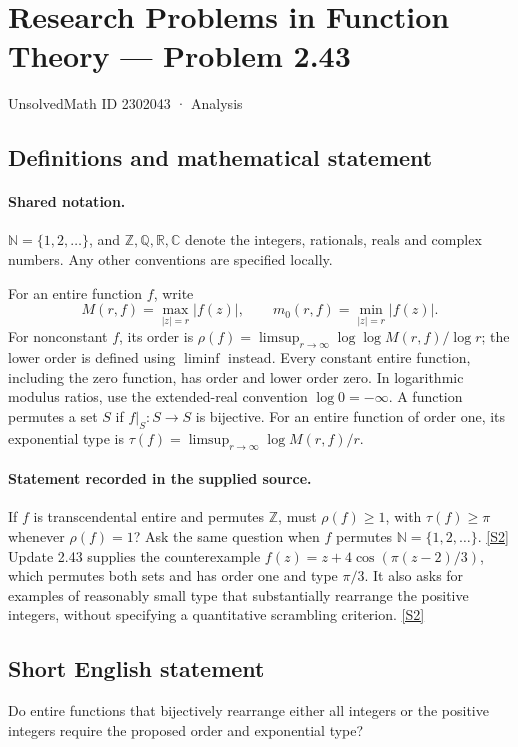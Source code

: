 \documentclass[11pt]{article}
\newcommand{\sref}[2]{\hyperlink{source:#1:#2}{[S#2]}}
\begin{document}
\setcounter{section}{2302042}
\section{Research Problems in Function Theory — Problem 2.43}\label{2302043}
{\small\sffamily UnsolvedMath ID 2302043 · Analysis}
\subsection{Definitions and mathematical statement}

\paragraph{Shared notation.}$\mathbb N=\{1,2,\ldots\}$, and $\mathbb Z,\mathbb Q,\mathbb R,\mathbb C$ denote the integers, rationals, reals and complex numbers. Any other conventions are specified locally.


For an entire function $f$, write
\[
 M(r,f)=\max_{|z|=r}|f(z)|,\qquad m_0(r,f)=\min_{|z|=r}|f(z)|.
\]
For nonconstant $f$, its order is $\rho(f)=\limsup_{r\to\infty}\log\log M(r,f)/\log r$;
the lower order is defined using $\liminf$ instead. Every constant entire function, including the zero function, has order and lower order zero. In logarithmic modulus ratios, use the extended-real convention $\log0=-\infty$.
A function permutes a set $S$ if $f|_S:S\to S$ is bijective. For an entire function of order one, its exponential type is $\tau(f)=\limsup_{r\to\infty}\log M(r,f)/r$.

\paragraph{Statement recorded in the supplied source.}
If $f$ is transcendental entire and permutes $\mathbb Z$, must $\rho(f)\ge1$, with $\tau(f)\ge\pi$ whenever $\rho(f)=1$? Ask the same question when $f$ permutes $\mathbb N=\{1,2,\ldots\}$. \sref{2302043}{2}
Update 2.43 supplies the counterexample $f(z)=z+4\cos(\pi(z-2)/3)$, which permutes both sets and has order one and type $\pi/3$. It also asks for examples of reasonably small type that substantially rearrange the positive integers, without specifying a quantitative scrambling criterion. \sref{2302043}{2}
\subsection{Short English statement}
Do entire functions that bijectively rearrange either all integers or the positive integers require the proposed order and exponential type?
\end{document}
